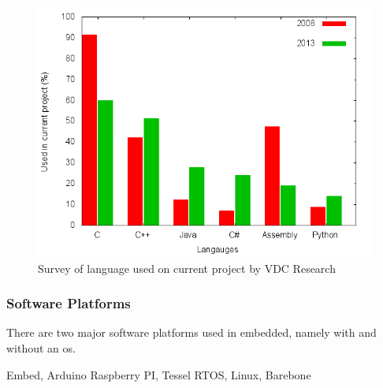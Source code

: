 \begin{figure}[H]
  \begin{center}
    \includegraphics[scale=0.5]{figures/plots/langs.png}
  \end{center}
  \caption{Survey of language used on current project by VDC Research}

  \label{fig:vdc:langs}
\end{figure}



\subsubsection{Software Platforms}

There are two major software platforms used in embedded, namely with and without an \gls{os}.


Embed, Arduino
Raspberry PI, Tessel
RTOS, Linux, Barebone
